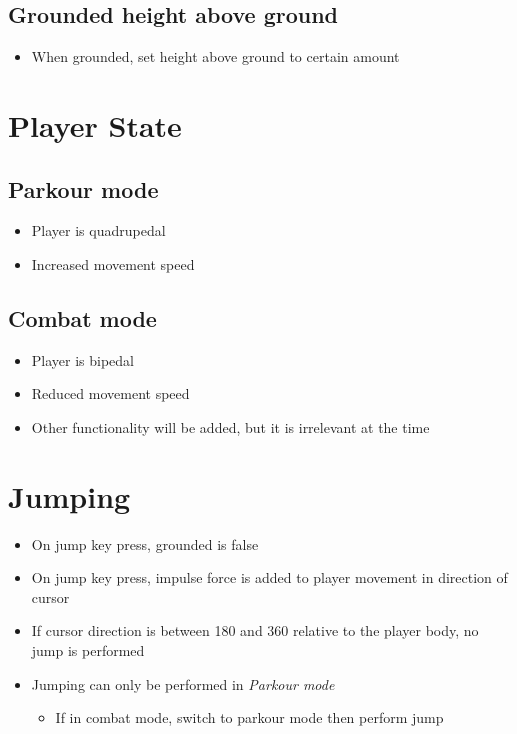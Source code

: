 \documentclass{article}
\begin{document}
    \subsection*{Grounded height above ground}
    \begin{itemize}
        \item When grounded, set height above ground to certain amount
    \end{itemize}

\section{Player State}
    \subsection*{Parkour mode}
    \begin{itemize}
        \item Player is quadrupedal
        \item Increased movement speed
    \end{itemize}
    \subsection*{Combat mode}
    \begin{itemize}
        \item Player is bipedal
        \item Reduced movement speed
        \item Other functionality will be added, but it is irrelevant at the time
    \end{itemize}

\section{Jumping}
    \begin{itemize}
        \item On jump key press, grounded is false
        \item On jump key press, impulse force is added to player movement in
            direction of cursor
        \item If cursor direction is between 180\degree{} and 360\degree{}
            relative to the player body, no jump is performed
        \item Jumping can only be performed in \emph{Parkour mode}
        \begin{itemize}
            \item If in combat mode, switch to parkour mode then perform jump
        \end{itemize}
    \end{itemize}
\end{document}
